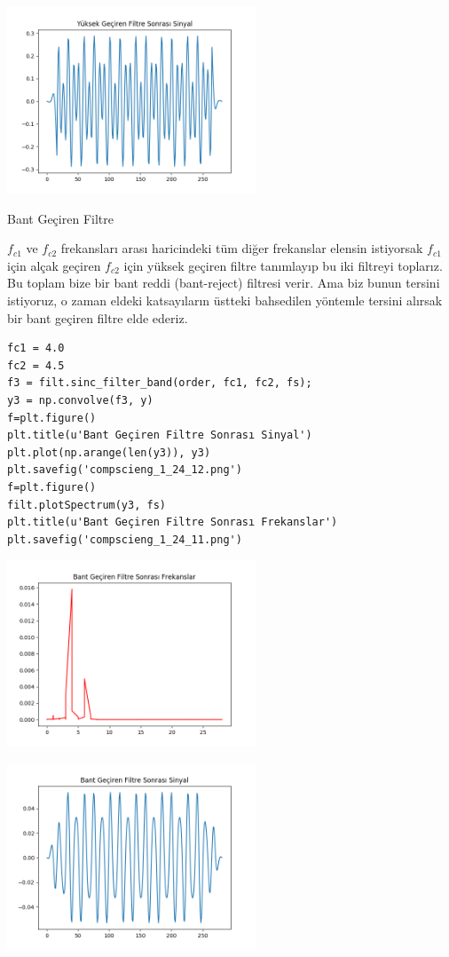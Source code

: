 \documentclass[12pt,fleqn]{article}\usepackage{../../common}
\begin{document}
\includegraphics[width=20em]{compscieng_1_24_10.png}

Bant Geçiren Filtre

$f_{c1}$ ve $f_{c2}$ frekansları arası haricindeki tüm diğer frekanslar
elensin istiyorsak $f_{c1}$ için alçak geçiren $f_{c2}$ için yüksek geçiren
filtre tanımlayıp bu iki filtreyi toplarız. Bu toplam bize bir bant reddi
(bant-reject) filtresi verir. Ama biz bunun tersini istiyoruz, o zaman
eldeki katsayıların üstteki bahsedilen yöntemle tersini alırsak bir bant
geçiren filtre elde ederiz.

\begin{verbatim}
fc1 = 4.0
fc2 = 4.5
f3 = filt.sinc_filter_band(order, fc1, fc2, fs);
y3 = np.convolve(f3, y)
f=plt.figure()
plt.title(u'Bant Geçiren Filtre Sonrası Sinyal')
plt.plot(np.arange(len(y3)), y3)
plt.savefig('compscieng_1_24_12.png')
f=plt.figure()
filt.plotSpectrum(y3, fs)
plt.title(u'Bant Geçiren Filtre Sonrası Frekanslar')
plt.savefig('compscieng_1_24_11.png')
\end{verbatim}

\includegraphics[width=20em]{compscieng_1_24_11.png}

\includegraphics[width=20em]{compscieng_1_24_12.png}
\end{document}
